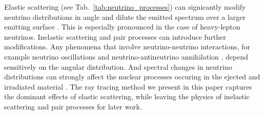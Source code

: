 \documentclass[aps,floatfix,prd,superscriptaddress,twocolumn]{revtex4-1}
\begin{document}
Elastic scattering (see Tab.~\ref{tab:neutrino_processes}) can signicantly
modify neutrino distributions in angle and dilute the emitted spectrum over a
larger emitting surface \citep{pere2016-asl}.
This is especially pronounced in the case of heavy-lepton neutrinos.
Inelastic scattering and pair processes can introduce further modifications.
Any phenomena that involve neutrino-neutrino interactions,
for example neutrino oscillations
\cite{duan2010-collective,malk2012-mnr_1,vlas2018-multiangle}
and neutrino-antineutrino annihilation \cite{asan2000-nunubar},
depend sensitively on the angular distribution.
And spectral changes in neutrino distributions can strongly affect the nuclear
processes occuring in the ejected and irradiated material
\cite{surm2006-grb_nucsynth,malk2012-mnr_1,caba2012-nu_spectra,fouc2016-m1_evolve_n}.
The ray tracing method we present in this paper captures the dominant effects
of elastic scattering, while leaving the physics of inelastic scattering and
pair processes for later work.
\end{document}
